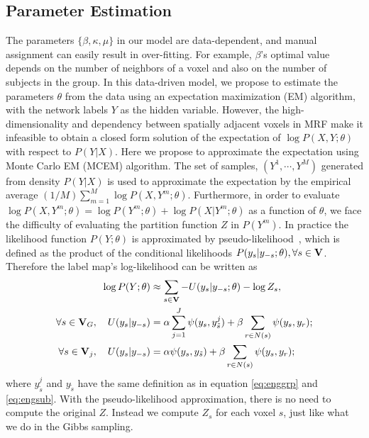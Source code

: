 \documentclass[review,authoryear]{elsarticle}
\begin{document}
\subsection{Parameter Estimation}
The parameters $\{\beta, \kappa, \mu\}$ in our model are data-dependent, and
manual assignment can easily result in over-fitting. For example, $\beta$'s
optimal value depends on the number of neighbors of a voxel and also on the
number of subjects in the group. In this data-driven model, we propose to
estimate the parameters $\theta$ from the data using an
expectation maximization (EM) algorithm, with the network labels $Y$ as the
hidden variable.  However, the high-dimensionality and dependency between
spatially adjacent voxels in MRF make it infeasible to obtain a closed form
solution of the expectation of $\log P(X,Y;\theta)$ with respect to $P(Y|X)$. Here we
propose to approximate the expectation using Monte Carlo EM (MCEM)
algorithm. The set of samples, $(Y^1, \cdots, Y^M)$ generated from density
$P(Y|X)$ is used to approximate the expectation by the empirical average
$(1/M)\sum_{m=1}^M\log P (X, Y^m;\theta)$.  Furthermore, in order to evaluate
$\log P(X,Y^m;\theta) = \log P(Y^m;\theta) + \log P(X|Y^m;\theta)$ as a function
of $\theta$, we face the difficulty of evaluating the partition function $Z$ in
$P(Y^m)$.  In practice the likelihood function $P(Y; \theta)$ is approximated by
pseudo-likelihood~\citep{besag_spatial_1974}, which is defined as the product of
the conditional likelihoods $P(y_s|y_{-s}; \theta), \forall s
\in \text{\bf V}$. Therefore the label map's log-likelihood can be written as
\begin{align}
\log P(Y; \theta) &\approx \sum_{s\in\text{\bf V}} -U(y_s | y_{-s}; \theta) - \log
Z_s, \label{eq:pseudoll}\\
\forall s \in \text{\bf V}_G, \quad U(y_s|y_{-s}) &=  \alpha \sum_{j=1}^J \psi(y_s,y_{\tilde s}^j) +\beta\sum_{r\in N(s)} \psi(y_s, y_r); \nonumber\\
\forall s \in \text{\bf V}_j, \quad U(y_s|y_{-s}) &= \alpha \psi(y_s, y_{\tilde s}) + \beta \sum_{r\in N(s)} \psi(y_s, y_r); \nonumber
\end{align}
where $y_{\tilde s}^j$ and $y_{\tilde s}$ have the same definition as in equation
\eqref{eq:enggrp} and \eqref{eq:engsub}. With the pseudo-likelihood
approximation, there is no need to compute the original $Z$. Instead we compute
$Z_s$ for each voxel $s$, just like what we do in the Gibbs sampling. 
\end{document}
